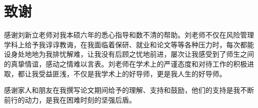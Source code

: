 \chapter{致谢}

感谢刘新立老师对我本硕六年的悉心指导和数不清的帮助。刘老师不仅在风险管理学科上给予我谆谆教诲，在我面临着保研、就业和论文等等各种压力时，每次都能设身处地地为我排忧解难，让我没有后顾之忧地前进，屡次让我感受到了师生之间的真挚情谊，感动之情难以言表。刘老师在学术上的严谨态度和对待工作的积极进取，都让我受益匪浅，不仅是我学术上的好导师，更是我人生的好导师。

感谢家人和朋友在我撰写论文期间给予的理解、支持和鼓励，他们的支持是我不断前行的动力，是我在困难时刻的坚强后盾。
